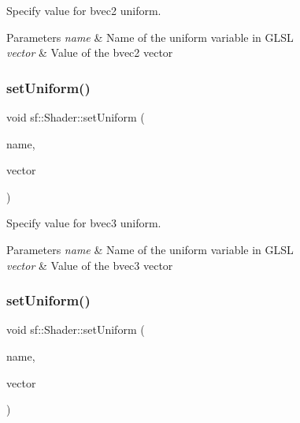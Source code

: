 Specify value for {\ttfamily bvec2} uniform. 


\begin{DoxyParams}{Parameters}
{\em name} & Name of the uniform variable in G\+L\+SL \\
\hline
{\em vector} & Value of the bvec2 vector \\
\hline
\end{DoxyParams}
\mbox{\label{classsf_1_1_shader_ab06830875c82476fbb9c975cdeb78a11}} 
\subsubsection{\texorpdfstring{set\+Uniform()}{setUniform()}\hspace{0.1cm}{\footnotesize\ttfamily [11/16]}}
{\footnotesize\ttfamily void sf\+::\+Shader\+::set\+Uniform (\begin{DoxyParamCaption}\item[{const std\+::string \&}]{name,  }\item[{const \hyperlink{namespacesf_1_1_glsl_a4166ffc506619b4912d576e6eba2c957}{Glsl\+::\+Bvec3} \&}]{vector }\end{DoxyParamCaption})}



Specify value for {\ttfamily bvec3} uniform. 


\begin{DoxyParams}{Parameters}
{\em name} & Name of the uniform variable in G\+L\+SL \\
\hline
{\em vector} & Value of the bvec3 vector \\
\hline
\end{DoxyParams}
\mbox{\label{classsf_1_1_shader_ac8db3e0adf1129abf24f0a51a7ec36f4}} 
\subsubsection{\texorpdfstring{set\+Uniform()}{setUniform()}\hspace{0.1cm}{\footnotesize\ttfamily [12/16]}}
{\footnotesize\ttfamily void sf\+::\+Shader\+::set\+Uniform (\begin{DoxyParamCaption}\item[{const std\+::string \&}]{name,  }\item[{const \hyperlink{structsf_1_1priv_1_1_vector4}{Glsl\+::\+Bvec4} \&}]{vector }\end{DoxyParamCaption})}



